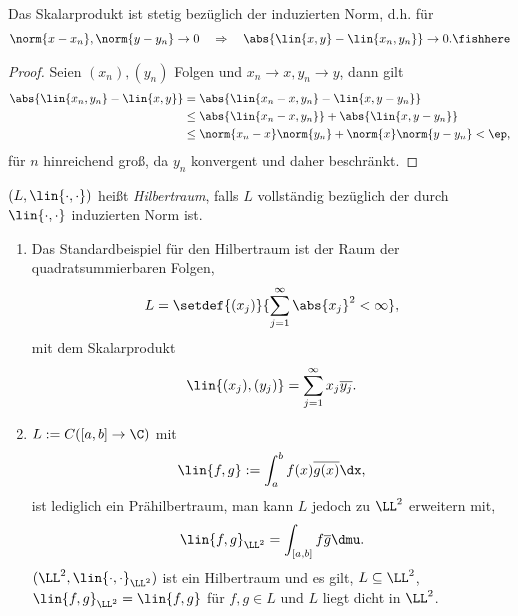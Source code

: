 \begin{cor}
\label{prop:1.4}
Das Skalarprodukt ist stetig bezüglich der induzierten Norm, d.h. für
\begin{align*}
\norm{x-x_n}, \norm{y-y_n}\to0\quad\Rightarrow\quad
\abs{\lin{x,y}-\lin{x_n,y_n}}\to0.\fishhere
\end{align*}
\end{cor}
\begin{proof}
Seien $(x_n), (y_n)$ Folgen und $x_n\to x, y_n\to y$, dann gilt
\begin{align*}
\abs{\lin{x_n,y_n}-\lin{x,y}} &= \abs{\lin{x_n-x,y_n}-\lin{x,y-y_n}}\\
&\le \abs{\lin{x_n-x,y_n}} + \abs{\lin{x,y-y_n}}\\
&\le \norm{x_n-x}\norm{y_n} + \norm{x}\norm{y-y_n} < \ep,
\end{align*}
für $n$ hinreichend groß, da $y_n$ konvergent und daher beschränkt.\qedhere
\end{proof}

\begin{defn}
\label{defn:1.5}
$(L,\lin{\cdot,\cdot})$ heißt \emph{Hilbertraum}, falls $L$
vollständig bezüglich der durch $\lin{\cdot,\cdot}$ induzierten Norm
ist.\fishhere
\end{defn}

\begin{bsp}
\label{bsp:1.6}
\begin{enumerate}[label=\arabic{*}.)]
  \item Das Standardbeispiel für den Hilbertraum ist der Raum der
  quadratsummierbaren Folgen,
\begin{align*}
L = \setdef{(x_j)}{\sum\limits_{j=1}^\infty \abs{x_j}^2 < \infty},
\end{align*}
mit dem Skalarprodukt
\begin{align*}
\lin{(x_j),(y_j)} = \sum\limits_{j=1}^\infty x_j\overline{y_j}.
\end{align*}
\item $L:= C([a,b]\to\C)$ mit
\begin{align*}
\lin{f,g} := \int_a^b f(x)\overline{g(x)}\dx,
\end{align*} 
ist lediglich ein Prähilbertraum, man kann $L$ jedoch zu $\LL^2$
erweitern mit,
\begin{align*}
\lin{f,g}_{\LL^2} = \int_{[a,b]} f\overline{g}\dmu.
\end{align*}
$(\LL^2,\lin{\cdot,\cdot}_{\LL^2})$ ist ein Hilbertraum und es gilt,
$L\subseteq\LL^2$, $\lin{f,g}_{\LL^2} = \lin{f,g}$ für $f,g\in L$ und $L$ liegt
dicht in $\LL^2$.
\bsphere
\end{enumerate}
\end{bsp}

